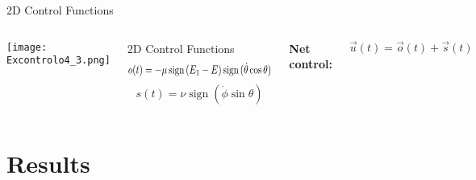 \documentclass{beamer}
\newcommand{\sign}{\mathop{\mathrm{sign}}}
\begin{document}
\begin{frame}[t]{2D Control Functions}
    
     \begin{columns}
             \centering
             \texttt{[image: Excontrolo4\_3.png]}
             
             \begin{block}{2D Control Functions}
               \vspace*{-\baselineskip}\setlength\belowdisplayshortskip{0pt}
               \begin{equation}  
               \scalebox{0.80}[1]{$ o(t)=-\mu  \sign\left({E_1-E}\right)\sign{(\dot{\theta} \cos{\theta})}$} 
                 \label{controlu2d}
               \end{equation}
               \begin{equation}
                 s(t)=\nu \sign{(\dot{\phi}\sin{\theta})}
                 \label{controlv2d}
               \end{equation}
             \end{block}
            \vspace{1 cm}
            \textbf{Net control:} 
             
               \begin{equation}
                 \Vec{u}(t)=\Vec{o}(t)+\Vec{s}(t)
               \end{equation}
           
     \end{columns}

\end{frame}

\section{Results}
\end{document}
